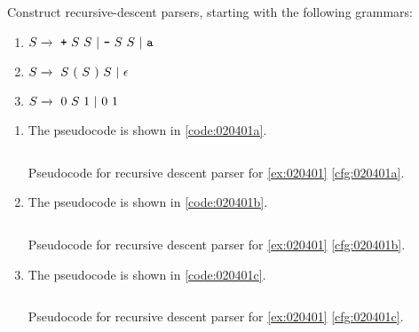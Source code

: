 \begin{exercise}\label{ex:020401}
    Construct recursive-descent parsers, starting with the following grammars:
    \begin{enumerate}[label=\alph*)]
        \item \label{cfg:020401a} $S \yld\ \texttt{+}\ S\ S\ |\ \texttt{-}\ S\ S\ |\ \texttt{a}$
        \item \label{cfg:020401b} $S \xrightarrow{}\ S\ (\ S\ )\ S\ |\ \epsilon$
        \item \label{cfg:020401c} $S \xrightarrow{}\ 0\ S\ 1\ |\ 0\ 1$
    \end{enumerate}
\end{exercise}
\begin{solution}\label{sol:020401}
    \begin{enumerate}[label=\alph*)]
        \item The pseudocode is shown in \cref{code:020401a}.
        \begin{listing}[!ht]
            \inputminted[linenos=true, frame=single]{c}{02/04/01/ex020401a.c}
            \caption{Pseudocode for recursive descent parser for \cref{ex:020401} \ref{cfg:020401a}.}
            \label{code:020401a}
        \end{listing}
        \item The pseudocode is shown in \cref{code:020401b}.
        \begin{listing}[!ht]
            \inputminted[linenos=true, frame=single]{c}{02/04/01/ex020401b.c}
            \caption{Pseudocode for recursive descent parser for \cref{ex:020401} \ref{cfg:020401b}.}
            \label{code:020401b}
        \end{listing}
        \item The pseudocode is shown in \cref{code:020401c}.
        \begin{listing}[!ht]
            \inputminted[linenos=true, frame=single]{c}{02/04/01/ex020401c.c}
            \caption{Pseudocode for recursive descent parser for \cref{ex:020401} \ref{cfg:020401c}.}
            \label{code:020401c}
        \end{listing}
    \end{enumerate}
\end{solution}